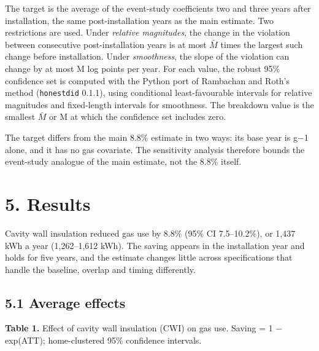 \documentclass[11pt,a4paper]{article}
\begin{document}
The target is the average of the event-study coefficients two and three years after installation, the same post-installation years as the main estimate. Two restrictions are used. Under \emph{relative magnitudes}, the change in the violation between consecutive post-installation years is at most \(\bar{M}\) times the largest such change before installation. Under \emph{smoothness}, the slope of the violation can change by at most M log points per year. For each value, the robust 95\% confidence set is computed with the Python port of Rambachan and Roth's method (\texttt{honestdid} 0.1.1), using conditional least-favourable intervals for relative magnitudes and fixed-length intervals for smoothness. The breakdown value is the smallest \(\bar{M}\) or M at which the confidence set includes zero.

The target differs from the main 8.8\% estimate in two ways: its base year is g−1 alone, and it has no gas covariate. The sensitivity analysis therefore bounds the event-study analogue of the main estimate, not the 8.8\% itself.

\section*{5. Results}

Cavity wall insulation reduced gas use by 8.8\% (95\% CI 7.5--10.2\%), or 1,437 kWh a year (1,262--1,612 kWh). The saving appears in the installation year and holds for five years, and the estimate changes little across specifications that handle the baseline, overlap and timing differently.

\subsection*{5.1 Average effects}

\textbf{Table 1.} Effect of cavity wall insulation (CWI) on gas use. Saving = 1 − exp(ATT); home-clustered 95\% confidence intervals.
\end{document}

